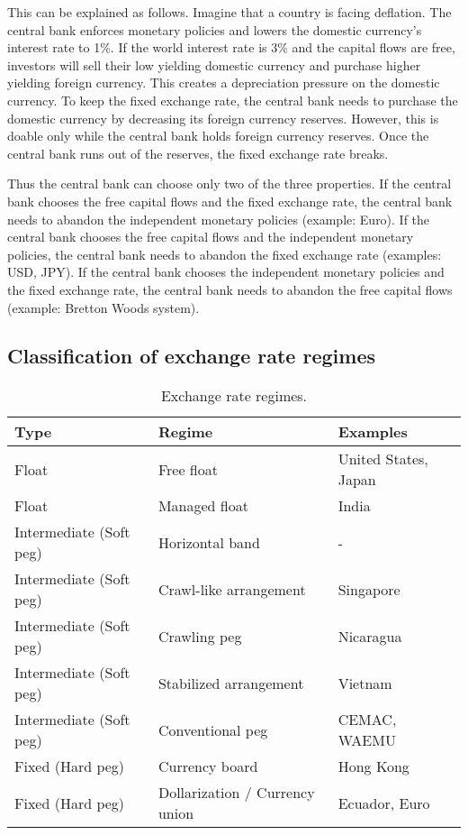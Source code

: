\documentclass[dvipdfmx,a4paper]{article}
\begin{document}
This can be explained as follows. Imagine that a country is facing deflation. The central bank enforces monetary policies and lowers the domestic currency's interest rate to 1\%. If the world interest rate is 3\% and the capital flows are free, investors will sell their low yielding domestic currency and purchase higher yielding foreign currency. This creates a depreciation pressure on the domestic currency. To keep the fixed exchange rate, the central bank needs to purchase the domestic currency by decreasing its foreign currency reserves. However, this is doable only while the central bank holds foreign currency reserves. Once the central bank runs out of the reserves, the fixed exchange rate breaks.

Thus the central bank can choose only two of the three properties. If the central bank chooses the free capital flows and the fixed exchange rate, the central bank needs to abandon the independent monetary policies (example: Euro). If the central bank chooses the free capital flows and the independent monetary policies, the central bank needs to abandon the fixed exchange rate (examples: USD, JPY). If the central bank chooses the independent monetary policies and the fixed exchange rate, the central bank needs to abandon the free capital flows (example: Bretton Woods system).

\subsection{Classification of exchange rate regimes}

\begin{table}[tb]
\begin{center}
\caption{Exchange rate regimes.}\vspace{2ex}
\begin{tabular}{lll}\hline
  Type & Regime & Examples\\\hline
  Float & Free float & United States, Japan\\
  Float & Managed float & India\\
  Intermediate (Soft peg) & Horizontal band & -\\
  Intermediate (Soft peg) & Crawl-like arrangement & Singapore\\
  Intermediate (Soft peg) & Crawling peg & Nicaragua\\
  Intermediate (Soft peg) & Stabilized arrangement & Vietnam\\
  Intermediate (Soft peg) & Conventional peg & CEMAC, WAEMU\\
  Fixed (Hard peg) & Currency board & Hong Kong\\
  Fixed (Hard peg) & Dollarization / Currency union & Ecuador, Euro\\\hline
\end{tabular}
\label{exchange_rate_regimes}
\end{center}
\end{table}
\end{document}
